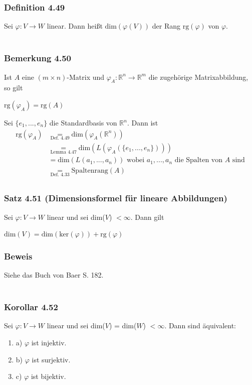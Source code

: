 \documentclass{article}
\begin{document}
\subsubsection*{Definition 4.49}
Sei $\varphi: V \rightarrow W$ linear. Dann heißt $\text{dim}(\varphi(V))$ der Rang $\text{rg}(\varphi)$ von $\varphi$. \\
\\
\subsubsection*{Bemerkung 4.50}
Ist $A$ eine $(m \times n)$-Matrix und $\varphi_A: \mathbb{R}^n \rightarrow \mathbb{R}^m$ die zugehörige Matrixabbildung, so gilt \\
\begin{center}
    $\text{rg}(\varphi_A) = \text{rg}(A)$ \\
\end{center}
Sei $\{e_1,...,e_n\}$ die Standardbasis von $\mathbb{R}^n$. Dann ist \\
\begin{align*}
    \text{rg}(\varphi_A) &\underset{\text{Def. 4.49}}{=} \text{dim}(\varphi_A(\mathbb{R}^n)) \\
    &\underset{\text{Lemma 4.47}}{=} \text{dim}(L(\varphi_A(\{e_1,...,e_n\}))) \\
    &= \text{dim}(L(a_1,...,a_n)) \text{ wobei } a_1,...,a_n \text{ die Spalten von } A \text{ sind} \\
    &\underset{\text{Def. 4.33}}{=} \text{Spaltenrang}(A) \\
\end{align*}
\subsubsection*{Satz 4.51 (Dimensionsformel für lineare Abbildungen)}
Sei $\varphi: V \rightarrow W$ linear und sei dim($V$) $< \infty$. Dann gilt \\
\begin{center}
    $\text{dim}(V) = \text{dim}(\text{ker}(\varphi)) + \text{rg}(\varphi)$ \\
\end{center}
\subsubsection*{Beweis}
Siehe das Buch von Baer S. 182. \\
\\
\subsubsection*{Korollar 4.52}
Sei $\varphi: V \rightarrow W$ linear und sei dim($V$) = dim($W$) $< \infty$. Dann sind äquivalent: \\
\begin{enumerate}
    \item a) $\varphi$ ist injektiv. \\
    \item b) $\varphi$ ist surjektiv. \\
    \item c) $\varphi$ ist bijektiv. \\
\end{enumerate}
\end{document}
